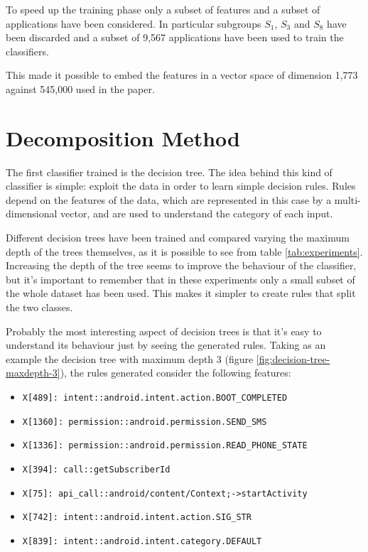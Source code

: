 \documentclass[paper=a4, fontsize=11pt]{scrartcl} %
\numberwithin{equation}{section} %
\numberwithin{figure}{section} %
\numberwithin{table}{section} %
\theoremstyle{definition}
\begin{document}
To speed up the training phase only a subset of features and a subset of
applications have been considered. In particular
subgroups $S_1$, $S_3$ and $S_8$ have been discarded and a subset of 9,567
applications have been used to train the classifiers.

This made it possible to embed the features in a vector space of dimension 1,773
against 545,000 used in the paper.


\section{Decomposition Method}

The first classifier trained is the decision tree. The idea behind this kind of
classifier is simple: exploit the data in order to learn simple decision rules.
Rules depend on the features of the data, which are represented in this case by
a multi-dimensional vector, and are used to understand the category of each input.

Different decision trees have been trained and compared varying the maximum
depth of the trees themselves, as it is possible to see from table \ref{tab:experiments}.
Increasing the depth of the tree seems to improve the behaviour of the classifier,
but it's important to remember that in these experiments only a small subset of
the whole dataset has been used. This makes it simpler to create rules that
split the two classes.

Probably the most interesting aspect of decision trees is that it's easy to
understand its behaviour just by seeing the generated rules. Taking as an example
the decision tree with maximum depth 3 (figure \ref{fig:decision-tree-maxdepth-3}),
the rules generated consider the following features:

\begin{itemize}
	\itemsep0em
	\item \texttt{X[489]: intent::android.intent.action.BOOT\_COMPLETED}
	\item \texttt{X[1360]: permission::android.permission.SEND\_SMS}
	\item \texttt{X[1336]: permission::android.permission.READ\_PHONE\_STATE}
	\item \texttt{X[394]: call::getSubscriberId}
	\item \texttt{X[75]: api\_call::android/content/Context;->startActivity}
	\item \texttt{X[742]: intent::android.intent.action.SIG\_STR}
	\item \texttt{X[839]: intent::android.intent.category.DEFAULT}
\end{itemize}
\end{document}
